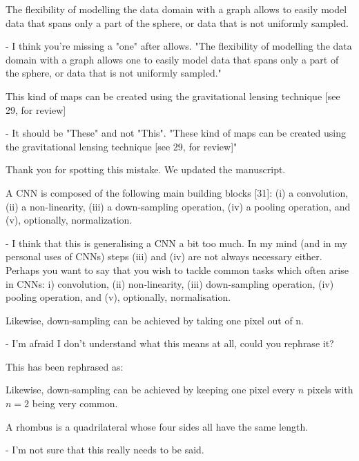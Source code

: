 \documentclass[12pt,a4paper]{article}
\newcommand{\nati}[1]{{\color[rgb]{.1,.6,.1}{NP: #1}}}
\newcommand{\todo}[1]{{\color[rgb]{.6,.1,.6}{TODO: #1}}}
\newcommand{\1}{\b{1}}              %
\newcommand{\0}{\b{0}}              %
\begin{document}
\begin{mdframed}[style=comment]
The flexibility of modelling the data domain with a graph allows to easily model data that spans only a part of the sphere, or data that is not uniformly sampled.

- I think you're missing a "one" after allows. "The flexibility of modelling the data domain with a graph allows one to easily model data that spans only a part of the sphere, or data that is not uniformly sampled."
\end{mdframed}
\todo{assigned: @tomek}
\nati{I am not sure of the english here.}

\begin{mdframed}[style=comment]
This kind of maps can be created using the gravitational lensing technique [see 29, for review]

- It should be "These" and not "This". "These kind of maps can be created using the gravitational lensing technique [see 29, for review]"
\end{mdframed}
Thank you for spotting this mistake. We updated the manuscript.

\begin{mdframed}[style=comment]
A CNN is composed of the following main building blocks [31]: (i) a convolution, (ii) a non-linearity, (iii) a down-sampling operation, (iv) a pooling operation, and (v), optionally, normalization.

- I think that this is generalising a CNN a bit too much. In my mind (and in my personal uses of CNNs) steps (iii) and (iv) are not always necessary either. Perhaps you want to say that you wish to tackle common tasks which often arise in CNNs: i) convolution, (ii) non-linearity, (iii) down-sampling operation, (iv) pooling operation, and (v), optionally, normalisation.
\end{mdframed}
\todo{assigned: @michael}


\begin{mdframed}[style=comment]
Likewise, down-sampling can be achieved by taking one pixel out of n.

- I'm afraid I don't understand what this means at all, could you rephrase it?
\end{mdframed}
This has been rephrased as:
\begin{mdframed}[style=manuscript]
Likewise, down-sampling can be achieved by keeping one pixel every $n$ pixels with $n=2$ being very common.
\end{mdframed}

\begin{mdframed}[style=comment]
A rhombus is a quadrilateral whose four sides all have the same length.

- I'm not sure that this really needs to be said.
\end{mdframed}
\todo{assigned: @michael}
\end{document}
